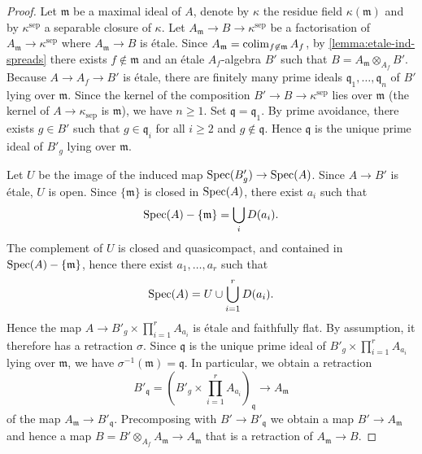 \begin{proof}
    Let $\mathfrak{m}$ be a maximal ideal of $A$, denote by $\kappa$ the residue field $\kappa(\mathfrak{m})$
    and by $\kappa^{\mathrm{sep}}$ a separable closure of $\kappa$. Let
    $A_{\mathfrak{m}} \to B \to \kappa^{\mathrm{sep}}$ be a factorisation of $A_{\mathfrak{m}} \to \kappa^{\mathrm{sep}}$
    where $A_{\mathfrak{m}} \to B$ is étale. Since $A_{\mathfrak{m}} = \operatorname{colim}_{f \not\in \mathfrak{m}} A_f$,
    by \ref{lemma:etale-ind-spreads} there exists $f \not\in \mathfrak{m}$ and an étale $A_f$-algebra $B'$
    such that $B = A_{\mathfrak{m}} \otimes_{A_f} B'$.
    Because $A \to A_f \to B'$ is étale,
    there are finitely many prime ideals $\mathfrak{q}_1, \ldots, \mathfrak{q}_n$ of $B'$ lying over $\mathfrak{m}$.
    Since the kernel of the composition $B' \to B \to \kappa^{\mathrm{sep}}$ lies over $\mathfrak{m}$
    (the kernel of $A \to \kappa_{\mathrm{sep}}$ is $\mathfrak{m}$), we have $n \ge 1$.
    Set $\mathfrak{q} = \mathfrak{q}_1$. By prime avoidance, there exists $g \in B'$ such that
    $g \in \mathfrak{q}_i$ for all $i \ge 2$ and $g \not\in \mathfrak{q}$. Hence
    $\mathfrak{q}$ is the unique prime ideal of $B'_g$ lying over $\mathfrak{m}$.

    Let $U$ be the image of the induced map $\mathrm{Spec}(B'_g) \to \mathrm{Spec}(A)$. Since $A \to B'$ is étale, $U$ is open.
    Since $\{\mathfrak{m}\}$ is closed in $\mathrm{Spec}(A)$, there exist $a_i$ such that
    \[
        \mathrm{Spec}(A) - \{\mathfrak{m}\} = \bigcup_{i} D(a_i)
    .\] The complement of $U$ is closed and quasicompact, and contained in $\mathrm{Spec}(A) - \{\mathfrak{m}\}$, hence
    there exist $a_1, \ldots, a_r$ such that
    \[
        \mathrm{Spec}(A) = U \cup \bigcup_{i=1}^r D(a_i)
    .\] Hence the map $A \to B'_g \times \prod_{i=1}^{r} A_{a_i}$ is étale and faithfully flat. By assumption,
    it therefore has a retraction $\sigma$. Since $\mathfrak{q}$ is the unique prime ideal of $B'_g \times \prod_{i=1}^{r} A_{a_i}$
    lying over $\mathfrak{m}$, we have $\sigma^{-1}(\mathfrak{m}) = \mathfrak{q}$. In particular,
    we obtain a retraction
    \[
        B'_{\mathfrak{q}} = \left(B'_g \times \prod_{i=1}^{r} A_{a_i}\right)_{\mathfrak{q}} \to A_{\mathfrak{m}}
    \] of the map $A_{\mathfrak{m}} \to B'_{\mathfrak{q}}$. Precomposing with $B' \to B'_{\mathfrak{q}}$ we obtain
    a map $B' \to A_{\mathfrak{m}}$ and hence a map
    $B = B' \otimes_{A_f} A_{\mathfrak{m}} \to A_{\mathfrak{m}}$ that is a retraction of $A_{\mathfrak{m}} \to B$.
\end{proof}

